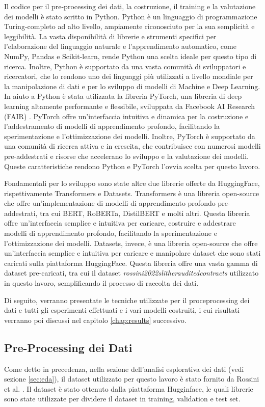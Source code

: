 \documentclass[../../Thesis.tex]{subfiles}
\begin{document}
Il codice per il pre-processing dei dati, la costruzione, il training e la valutazione dei modelli è stato scritto in Python. Python è un linguaggio di programmazione Turing-completo ad alto livello, ampiamente riconosciuto per la sua semplicità e leggibilità. La vasta disponibilità di librerie e strumenti specifici per l'elaborazione del linguaggio naturale e l'apprendimento automatico, come NumPy, Pandas e Scikit-learn, rende Python una scelta ideale per questo tipo di ricerca. Inoltre, Python è supportato da una vasta comunità di sviluppatori e ricercatori, che lo rendono uno dei linguaggi più utilizzati a livello mondiale per la manipolazione di dati e per lo sviluppo di modelli di Machine e Deep Learning. In aiuto a Python è stata utilizzata la libreria PyTorch,  una libreria di deep learning altamente performante e flessibile, sviluppata da Facebook AI Research (FAIR) \cite{Pytorch}. PyTorch offre un'interfaccia intuitiva e dinamica per la costruzione e l'addestramento di modelli di apprendimento profondo, facilitando la sperimentazione e l'ottimizzazione dei modelli. Inoltre, PyTorch è supportato da una comunità di ricerca attiva e in crescita, che contribuisce con numerosi modelli pre-addestrati e risorse che accelerano lo sviluppo e la valutazione dei modelli. Queste caratteristiche rendono Python e PyTorch l'ovvia scelta per questo lavoro.

Fondamentali per lo sviluppo sono state altre due librerie offerte da HuggingFace, rispettivamente Transformers e Datasets. Transformers è una libreria open-source che offre un'implementazione di modelli di apprendimento profondo pre-addestrati, tra cui BERT, RoBERTa, DistilBERT e molti altri. Questa libreria offre un'interfaccia semplice e intuitiva per caricare, costruire e addestrare modelli di apprendimento profondo, facilitando la sperimentazione e l'ottimizzazione dei modelli. Datasets, invece, è una libreria open-source che offre un'interfaccia semplice e intuitiva per caricare e manipolare dataset che sono stati caricati sulla piattaforma HuggingFace. Questa libreria offre una vasta gamma di dataset pre-caricati, tra cui il dataset \textit{rossini2022slitherauditedcontracts} utilizzato in questo lavoro, semplificando il processo di raccolta dei dati. 

Di seguito, verranno presentate le tecniche utilizzate per il proceprocessing dei dati e tutti gli esperimenti effettuati e i vari modelli costruiti, i cui risultati verranno poi discussi nel capitolo \ref{chap:results} successivo.
\subsection{Pre-Processing dei Dati}
Come detto in precedenza, nella sezione dell'analisi esplorativa dei dati (vedi sezione \ref{sec:eda}), il dataset utilizzato per questo lavoro è stato fornito da Rossini et al. \cite{rossini2022slitherauditedcontracts}. Il dataset è stato ottenuto dalla piattaforma Hugginface, le quali librerie sono state utilizzate per dividere il dataset in training, validation e test set. 
\end{document}
